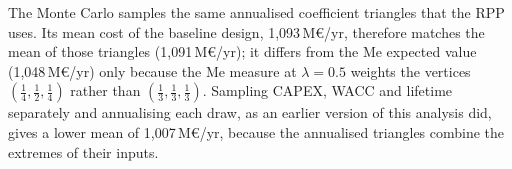 The Monte Carlo samples the same annualised coefficient triangles that the RPP uses. Its mean cost of the baseline design, 1,093\,M€/yr, therefore matches the mean of those triangles (1,091\,M€/yr); it differs from the Me expected value (1,048\,M€/yr) only because the Me measure at $\lambda=0.5$ weights the vertices $(\tfrac14,\tfrac12,\tfrac14)$ rather than $(\tfrac13,\tfrac13,\tfrac13)$. Sampling CAPEX, WACC and lifetime separately and annualising each draw, as an earlier version of this analysis did, gives a lower mean of 1,007\,M€/yr, because the annualised triangles combine the extremes of their inputs.
